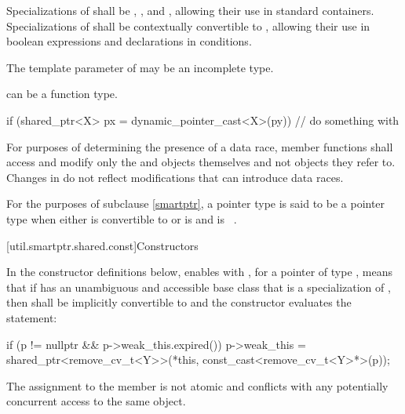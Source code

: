 \pnum
Specializations of  shall be ,
, and , allowing their use in standard
containers. Specializations of  shall be
contextually convertible to ,
allowing their use in boolean expressions and declarations in conditions.

\pnum
The template parameter  of 
may be an incomplete type.
\begin{note}
 can be a function type.
\end{note}

\pnum
\begin{example}
\begin{codeblock}
if (shared_ptr<X> px = dynamic_pointer_cast<X>(py)) {
  // do something with 
}
\end{codeblock}
\end{example}

\pnum
For purposes of determining the presence of a data race, member functions shall
access and modify only the  and  objects
themselves and not objects they refer to. Changes in  do not
reflect modifications that can introduce data races.

\pnum
For the purposes of subclause \ref{smartptr},
a pointer type  is said to be
a pointer type  when either
 is convertible to  or
 is  and  is \cv{}~.

[util.smartptr.shared.const]{Constructors}

\pnum
In the constructor definitions below,
enables  with ,
for a pointer  of type ,
means that if  has an unambiguous and accessible base class
that is a specialization of ,
then  shall be implicitly convertible to  and
the constructor evaluates the statement:
\begin{codeblock}
if (p != nullptr && p->weak_this.expired())
  p->weak_this = shared_ptr<remove_cv_t<Y>>(*this, const_cast<remove_cv_t<Y>*>(p));
\end{codeblock}
The assignment to the  member is not atomic and
conflicts with any potentially concurrent access to the same object.

